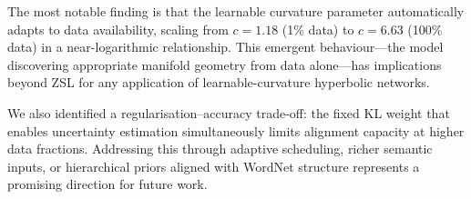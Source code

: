 \documentclass{article}
\begin{document}
The most notable finding is that the learnable curvature parameter automatically adapts to data availability, scaling from $c = 1.18$ (1\% data) to $c = 6.63$ (100\% data) in a near-logarithmic relationship.
This emergent behaviour---the model discovering appropriate manifold geometry from data alone---has implications beyond ZSL for any application of learnable-curvature hyperbolic networks.

We also identified a regularisation--accuracy trade-off: the fixed KL weight that enables uncertainty estimation simultaneously limits alignment capacity at higher data fractions.
Addressing this through adaptive scheduling, richer semantic inputs, or hierarchical priors aligned with WordNet structure represents a promising direction for future work.



\end{document}
